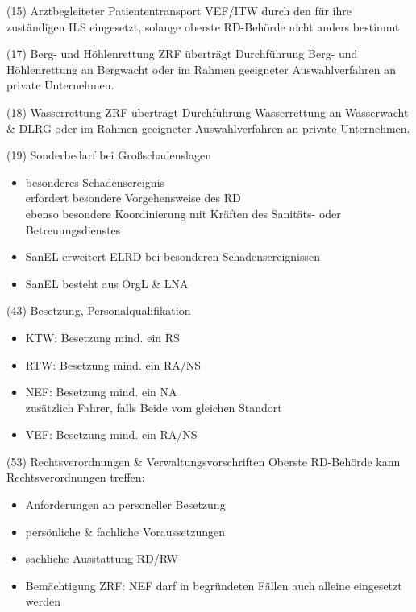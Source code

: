 \begin{sectionbox}{(15) Arztbegleiteter Patiententransport}
    VEF/ITW durch den für ihre zuständigen ILS eingesetzt, solange oberste RD-Behörde nicht anders bestimmt
\end{sectionbox}
\begin{sectionbox}{(17) Berg- und Höhlenrettung}
    ZRF überträgt Durchführung Berg- und Höhlenrettung an Bergwacht oder im Rahmen geeigneter Auswahlverfahren an private Unternehmen.
\end{sectionbox}
\begin{sectionbox}{(18) Wasserrettung}
    ZRF überträgt Durchführung Wasserrettung an Wasserwacht \& DLRG oder im Rahmen geeigneter Auswahlverfahren an private Unternehmen.
\end{sectionbox}
\begin{sectionbox}{(19) Sonderbedarf bei Großschadenslagen}
    \begin{itemize}
        \item besonderes Schadensereignis\\
        \ra erfordert besondere Vorgehensweise des RD\\
        \ra ebenso besondere Koordinierung mit Kräften des Sanitäts- oder Betreuungsdienstes
        \item SanEL erweitert ELRD bei besonderen Schadensereignissen
        \item SanEL besteht aus OrgL \& LNA
    \end{itemize}
\end{sectionbox}
\begin{sectionbox}{(43) Besetzung, Personalqualifikation}
    \begin{itemize}
        \item KTW: Besetzung mind. ein RS
        \item RTW: Besetzung mind. ein RA/NS
        \item NEF: Besetzung mind. ein NA\\
        \ra zusätzlich Fahrer, falls Beide vom gleichen Standort
        \item VEF: Besetzung mind. ein RA/NS
    \end{itemize}
\end{sectionbox}
\begin{sectionbox}{(53) Rechtsverordnungen \& Verwaltungsvorschriften}
    Oberste RD-Behörde kann Rechtsverordnungen treffen:
    \begin{itemize}
        \item Anforderungen an personeller Besetzung
        \item persönliche \& fachliche Voraussetzungen
        \item sachliche Ausstattung RD/RW
        \item Bemächtigung ZRF: NEF darf in begründeten Fällen auch alleine eingesetzt werden
    \end{itemize}
\end{sectionbox}